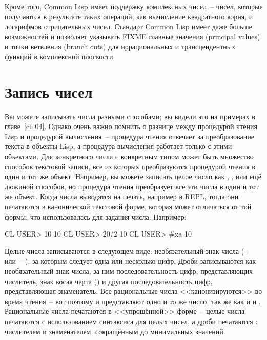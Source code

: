 Кроме того, Common Lisp имеет поддержку комплексных чисел~-- чисел, которые получаются в
результате таких операций, как вычисление квадратного корня, и логарифмов отрицательных
чисел. Стандарт Common Lisp имеет даже больше возможностей и позволяет указывать FIXME
главные значения (principal values) и точки ветвления (branch cuts) для иррациональных и
трансцендентных функций в комплексной плоскости.

\section{Запись чисел}

Вы можете записывать числа разными способами; вы видели это на примерах в
главе~\ref{ch:04}.  Однако очень важно помнить о разнице между процедурой чтения Lisp и
процедурой вычисления~-- процедура чтения отвечает за преобразование текста в объекты
Lisp, а процедура вычисления работает только с этими объектами.  Для конкретного числа с
конкретным типом может быть множество способов текстовой записи, все из которых
преобразуются процедурой чтения в один и тот же объект.  Например, вы можете записать
целое число  как , ,  или ещё дюжиной способов,
но процедура чтения преобразует все эти числа в один и тот же объект.  Когда числа
выводятся на печать, например в REPL, тогда они печатаются в канонической текстовой форме,
которая может отличаться от той формы, что использовалась для задания числа.
Например:

\begin{myverb}
  CL-USER> 10
  10
  CL-USER> 20/2
  10
  CL-USER> #xa
  10
\end{myverb}

Целые числа записываются в следующем виде: необязательный знак числа ($+$ или~$-$), за
которым следует одна или несколько цифр.  Дроби записываются как необязательный знак
числа, за ним последовательность цифр, представляющих числитель, знак косая черта
(\code{/}) и другая последовательность цифр, представляющая знаменатель.  Все
рациональные числа <<канонизируются>> во время чтения~-- вот поэтому  и 
представляют одно и то же число, так же как и  и .  Рациональные числа
печатаются в <<упрощённой>> форме~-- целые числа печатаются с использованием синтаксиса для
целых чисел, а дроби печатаются с числителем и знаменателем, сокращённым до минимальных
значений.

